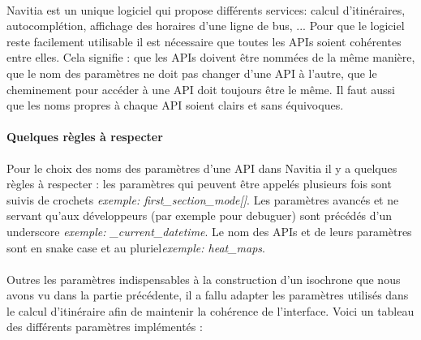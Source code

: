 \documentclass[a4paper]{report}
\begin{document}
\paragraph{} Navitia est un unique logiciel qui propose différents services: calcul d'itinéraires, autocomplétion, affichage des horaires d'une ligne de bus, ... Pour que le logiciel reste facilement utilisable il est nécessaire que toutes les APIs soient cohérentes entre elles. Cela signifie : que les APIs doivent être nommées de la même manière, que le nom des paramètres ne doit pas changer d'une API à l'autre, que le cheminement pour accéder à une API doit toujours être le même. Il faut aussi que les noms propres à chaque API soient clairs et sans équivoques. 

\paragraph{Quelques règles à respecter} Pour le choix des noms des paramètres d'une API dans Navitia il y a quelques règles à respecter : les paramètres qui peuvent être appelés plusieurs fois sont suivis de crochets \emph{exemple: first\_section\_mode[]}. Les paramètres avancés et ne servant qu'aux développeurs (par exemple pour debuguer) sont précédés d'un underscore \emph{exemple: \_current\_datetime}. Le nom des APIs et de leurs paramètres sont en snake case et au pluriel\emph{exemple: heat\_maps}.

\paragraph{} Outres les paramètres indispensables à la construction d'un isochrone que nous avons vu dans la partie précédente, il a fallu adapter les paramètres utilisés dans le calcul d'itinéraire afin de maintenir la cohérence de l'interface. Voici un tableau des différents paramètres implémentés :
\end{document}
